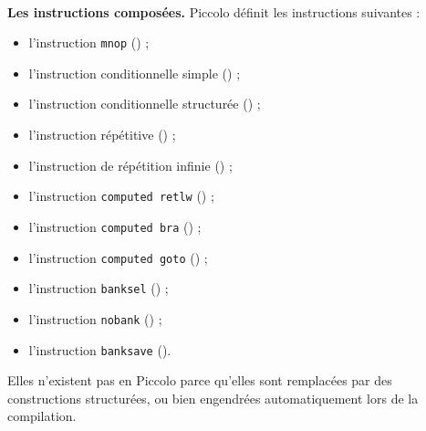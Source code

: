 ~\\
\textbf{Les instructions composées.} Piccolo définit les instructions suivantes :
\begin{itemize}
  \item l'instruction \texttt{mnop} () ;
  \item l'instruction conditionnelle simple () ;
  \item l'instruction conditionnelle structurée () ;
  \item l'instruction répétitive () ;
  \item l'instruction de répétition infinie () ;
  \item l'instruction \texttt{computed retlw} () ;
  \item l'instruction \texttt{computed bra} () ;
  \item l'instruction \texttt{computed goto} () ;
  \item l'instruction \texttt{banksel} () ;
  \item l'instruction \texttt{nobank} () ;
  \item l'instruction \texttt{banksave} ().
\end{itemize}





Elles n’existent pas en Piccolo parce qu’elles sont remplacées par des constructions structurées, ou bien engendrées automatiquement lors de la compilation.

